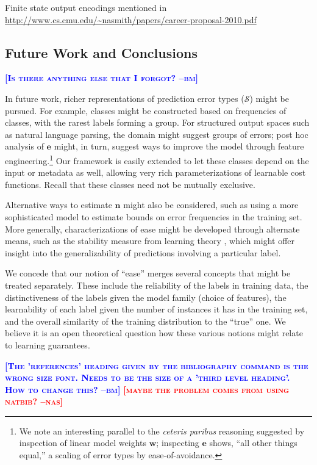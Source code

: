 \documentclass{article} %
\newcommand{\bmcomment}[1]{\textcolor{blue}{\textsc{\textbf{[#1 --bm]}}}}
\newcommand{\nascomment}[1]{\textcolor{red}{\textsc{\textbf{[#1 --nas]}}}}
\begin{document}
Finite state output encodings mentioned in 
\url{http://www.cs.cmu.edu/~nasmith/papers/career-proposal-2010.pdf}
\citep{loper2008encoding}

\subsection{Future Work and Conclusions}

\bmcomment{Is there anything else that I forgot?}

In future work, richer representations of prediction error types
($\mathcal{S}$) might be pursued.  For example, classes might be 
constructed based on frequencies of classes, with the rarest labels forming
a group.  For structured output spaces such as natural language
parsing, the domain might suggest
groups of errors; post hoc analysis of $\mathbf{e}$ might, in turn,
suggest ways to improve the model through feature
engineering.\footnote{We note an interesting parallel to the
  \emph{ceteris paribus} reasoning suggested by inspection of
linear model weights $\mathbf{w}$; inspecting $\mathbf{e}$ shows,
``all other things equal,'' a scaling of error types by ease-of-avoidance.}
Our framework is easily extended to let these classes depend on
the input or metadata as well, allowing very rich parameterizations of
learnable cost functions.  Recall that these classes need not be mutually exclusive.

Alternative ways to estimate $\mathbf{n}$ might also be considered,
such as using a more sophisticated model to estimate bounds on error
frequencies in the training set.  More generally, characterizations of
ease might be developed through alternate means, such as the
stability measure from learning theory \citep{mukherjee2006learning},
which might offer insight into the generalizability of predictions
involving a particular label.

We concede that our notion of ``ease'' merges several concepts that
might be treated separately.  These include the reliability of the
labels in training data, the distinctiveness of the labels given the
model family (choice of features), the learnability of each label
given the number of instances it has in the training set, and the
overall similarity of the training distribution to the ``true'' one.
We believe it is an open theoretical question how these various
notions might relate to learning guarantees.





\bmcomment{The 'references' heading given by the 
bibliography command is the wrong size font.  Needs to
be the size of a 'third level heading'.  How to change this?}
\nascomment{maybe the problem comes from using natbib?}


\end{document}
